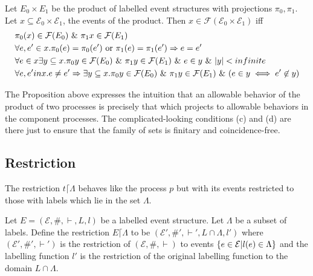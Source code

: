 \documentclass{article}
\begin{document}
\begin{proposition}
    
Let $E_0 \times E_1$ be the product of labelled event structures with projections
$\pi_0,\pi_1$.
Let $x \subseteq \mathcal{E}_0 \times \mathcal{E}_1$, the events of the product.
Then $x \in \mathcal{F}(\mathcal{E}_0 \times \mathcal{E}_1)$ iff
\begin{align*}
   & \pi_0(x)  \in \mathcal{F}(E_0) \ \& \  \pi_1x \in \mathcal{F}(E_1) \\
   & \forall e,e' \in x.\pi_0(e)=\pi_0(e') \text{ or } \pi_1(e) = \pi_1(e') \Rightarrow e = e' \\
   & \forall e \in x \exists y \subseteq x. \pi_0 y \in \mathcal{F}(E_0) \ \& \  \pi_1y \in \mathcal{F}(E_1)
   \ \& \  e \in y \ \& \  |y| < infinite \\
   & \forall e,e' in x. e \neq e' \Rightarrow \exists y \subseteq x.\pi_0 y \in \mathcal{F}(E_0)
   \ \& \  \pi_1y \in \mathcal{F}(E_1) \ \& \  (e \in y \iff e' \not \in y)
\end{align*}

\end{proposition}
The Proposition above expresses the intuition that an allowable behavior of the product
of two processes is precisely that which projects to allowable behaviors in the component
processes.
The complicated-looking conditions (c) and (d) are there just to ensure that the family
of sets is finitary and coincidence-free.

\subsection{Restriction}

The restriction $t \lceil \Lambda$ behaves like the process $p$ but with its events
restricted to those with labels which lie in the set $\Lambda$.

\begin{definition}
    
Let $E = (\mathcal{E},\#,\vdash,L,l)$ be a labelled event structure.
Let $\Lambda$ be a subset of labels.
Define the restriction $E\lceil \Lambda$ to be $(\mathcal{E'},\#',\vdash',L\cap \Lambda,l')$
where $(\mathcal{E'},\#',\vdash')$ is the restriction of $(\mathcal{E},\#,\vdash)$ 
to events $\{e \in \mathcal{E}|l(e) \in \Lambda\}$ and the labelling function $l'$
is the restriction of the original labelling function to the domain $L \cap \Lambda$.

\end{definition}
\end{document}
